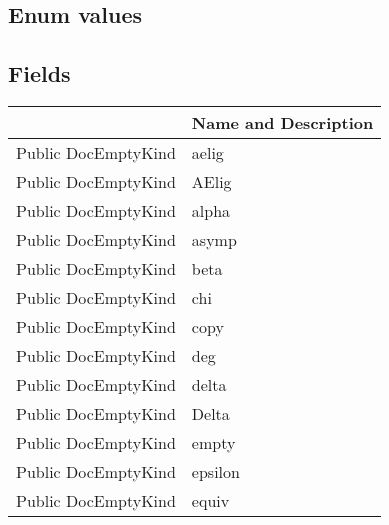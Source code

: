 \documentclass[11pt, oneside, a4paper]{book}
\begin{document}
\subsection{Enum values}

\subsection{Fields}
\begin{center}
\begin{tabular}{| p{3cm} | p{12cm} | }
\hline
\textbf{ } & \textbf{ Name and Description}\\
\hline
 Public  DocEmptyKind &  aelig\hypertarget{SoftwareEngineeringTools.{}Documentation.{}DocEmptyKind.{}aelig}{}\\
\hline
 Public  DocEmptyKind &  AElig\hypertarget{SoftwareEngineeringTools.{}Documentation.{}DocEmptyKind.{}AElig}{}\\
\hline
 Public  DocEmptyKind &  alpha\hypertarget{SoftwareEngineeringTools.{}Documentation.{}DocEmptyKind.{}alpha}{}\\
\hline
 Public  DocEmptyKind &  asymp\hypertarget{SoftwareEngineeringTools.{}Documentation.{}DocEmptyKind.{}asymp}{}\\
\hline
 Public  DocEmptyKind &  beta\hypertarget{SoftwareEngineeringTools.{}Documentation.{}DocEmptyKind.{}beta}{}\\
\hline
 Public  DocEmptyKind &  chi\hypertarget{SoftwareEngineeringTools.{}Documentation.{}DocEmptyKind.{}chi}{}\\
\hline
 Public  DocEmptyKind &  copy\hypertarget{SoftwareEngineeringTools.{}Documentation.{}DocEmptyKind.{}copy}{}\\
\hline
 Public  DocEmptyKind &  deg\hypertarget{SoftwareEngineeringTools.{}Documentation.{}DocEmptyKind.{}deg}{}\\
\hline
 Public  DocEmptyKind &  delta\hypertarget{SoftwareEngineeringTools.{}Documentation.{}DocEmptyKind.{}delta}{}\\
\hline
 Public  DocEmptyKind &  Delta\hypertarget{SoftwareEngineeringTools.{}Documentation.{}DocEmptyKind.{}Delta}{}\\
\hline
 Public  DocEmptyKind &  empty\hypertarget{SoftwareEngineeringTools.{}Documentation.{}DocEmptyKind.{}empty}{}\\
\hline
 Public  DocEmptyKind &  epsilon\hypertarget{SoftwareEngineeringTools.{}Documentation.{}DocEmptyKind.{}epsilon}{}\\
\hline
 Public  DocEmptyKind &  equiv\hypertarget{SoftwareEngineeringTools.{}Documentation.{}DocEmptyKind.{}equiv}{}\\

\end{tabular}
\end{center}
\end{document}
